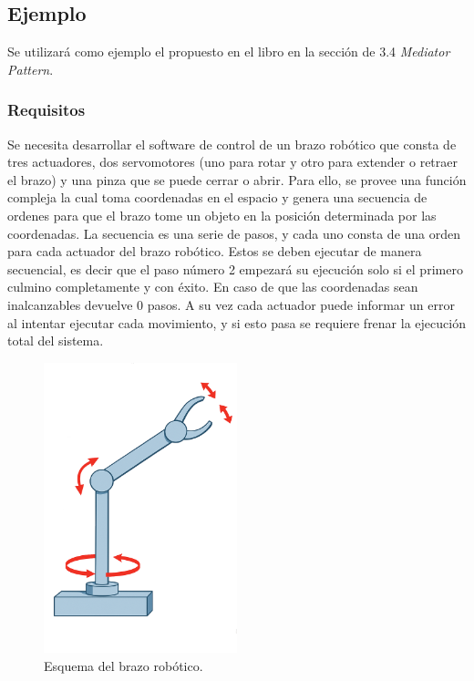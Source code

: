 \subsection{Ejemplo}

Se utilizará como ejemplo el propuesto en el libro \cite{douglass} en la sección de 3.4 \textit{Mediator Pattern}.

\subsubsection*{Requisitos}

Se necesita desarrollar el software de control de un brazo robótico que consta de tres actuadores, dos servomotores (uno para rotar y otro para extender o retraer el brazo) y una pinza que se puede cerrar o abrir. Para ello, se provee una función compleja la cual toma coordenadas en el espacio y genera una secuencia de ordenes para que el brazo tome un objeto en la posición determinada por las coordenadas. La secuencia es una serie de pasos, y cada uno consta de una orden para cada actuador del brazo robótico. Estos se deben ejecutar de manera secuencial, es decir que el paso número 2 empezará su ejecución solo si el primero culmino completamente y con éxito. En caso de que las coordenadas sean inalcanzables devuelve 0 pasos. A su vez cada actuador puede informar un error al intentar ejecutar cada movimiento, y si esto pasa se requiere frenar la ejecución total del sistema.

\begin{figure}[h]
\caption{Esquema del brazo robótico.}
\begin{centering}
{\includegraphics[width=0.5\textwidth]{brazo3.png}\par}
\end{centering}
\end{figure}

